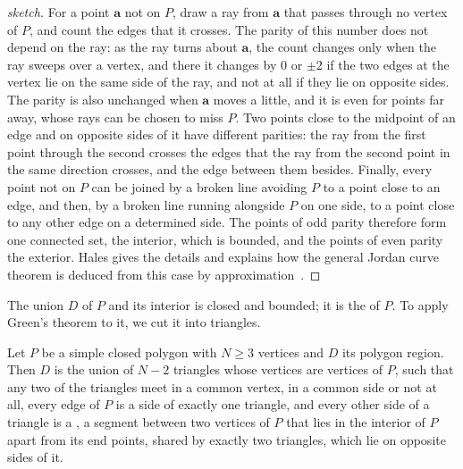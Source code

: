 \begin{proof}[sketch]
For a point $\mathbf a$ not on $P$, draw a ray from $\mathbf a$ that passes through no vertex of $P$, and count the edges that it crosses. The parity of this number does not depend on the ray: as the ray turns about $\mathbf a$, the count changes only when the ray sweeps over a vertex, and there it changes by $0$ or $\pm2$ if the two edges at the vertex lie on the same side of the ray, and not at all if they lie on opposite sides. The parity is also unchanged when $\mathbf a$ moves a little, and it is even for points far away, whose rays can be chosen to miss $P$. Two points close to the midpoint of an edge and on opposite sides of it have different parities: the ray from the first point through the second crosses the edges that the ray from the second point in the same direction crosses, and the edge between them besides. Finally, every point not on $P$ can be joined by a broken line avoiding $P$ to a point close to an edge, and then, by a broken line running alongside $P$ on one side, to a point close to any other edge on a determined side. The points of odd parity therefore form one connected set, the interior, which is bounded, and the points of even parity the exterior. Hales gives the details and explains how the general Jordan curve theorem is deduced from this case by approximation~\cite{hales2007}.
\end{proof}

The union $D$ of $P$ and its interior is closed and bounded; it is the  of $P$. To apply Green's theorem to it, we cut it into triangles.

\begin{theorem}
\label{thm:triangulation}
Let $P$ be a simple closed polygon with $N\ge3$ vertices and $D$ its polygon region. Then $D$ is the union of $N-2$ triangles whose vertices are vertices of $P$, such that any two of the triangles meet in a common vertex, in a common side or not at all, every edge of $P$ is a side of exactly one triangle, and every other side of a triangle is a , a segment between two vertices of $P$ that lies in the interior of $P$ apart from its end points, shared by exactly two triangles, which lie on opposite sides of it.
\end{theorem}

